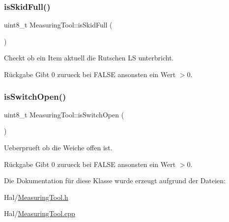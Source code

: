 \subsubsection{\texorpdfstring{is\+Skid\+Full()}{isSkidFull()}}
{\footnotesize\ttfamily uint8\+\_\+t Measuring\+Tool\+::is\+Skid\+Full (\begin{DoxyParamCaption}{ }\end{DoxyParamCaption})}

Checkt ob ein Item aktuell die Rutschen LS unterbricht.

\begin{DoxyReturn}{Rückgabe}
Gibt 0 zurueck bei F\+A\+L\+SE ansonsten ein Wert $>$0. 
\end{DoxyReturn}
\hypertarget{class_measuring_tool_ad46b12c36f63fa9b597b1df6468d6aac}{}\label{class_measuring_tool_ad46b12c36f63fa9b597b1df6468d6aac} 
\subsubsection{\texorpdfstring{is\+Switch\+Open()}{isSwitchOpen()}}
{\footnotesize\ttfamily uint8\+\_\+t Measuring\+Tool\+::is\+Switch\+Open (\begin{DoxyParamCaption}{ }\end{DoxyParamCaption})}

Ueberprueft ob die Weiche offen ist.

\begin{DoxyReturn}{Rückgabe}
Gibt 0 zurueck bei F\+A\+L\+SE ansonsten ein Wert $>$0. 
\end{DoxyReturn}


Die Dokumentation für diese Klasse wurde erzeugt aufgrund der Dateien\+:\begin{DoxyCompactItemize}
\item 
Hal/\hyperlink{_measuring_tool_8h}{Measuring\+Tool.\+h}\item 
Hal/\hyperlink{_measuring_tool_8cpp}{Measuring\+Tool.\+cpp}\end{DoxyCompactItemize}
